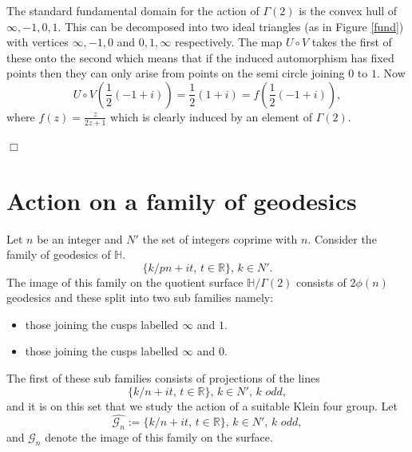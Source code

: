 \documentclass[12pt,a4paper]{amsart}
\def\HH{\mathbb{H}}
\def\xx{\HH/g2}
\def\RR{\mathbb{R}}
\def\g2{\Gamma(2)}
\def\xx{\HH/\g2}
\def\gg{\mathcal{G}_n}
\begin{document}
\proof The standard  fundamental domain for the action of $\g2$ 
is the convex hull of $\infty, -1, 0 , 1$.
This can be decomposed into two ideal triangles (as in Figure \ref{fund})
with vertices $\infty, -1, 0 $ and $ 0 , 1,\infty$ respectively.
The map  $U\circ V$ takes the first of these onto the second
which means that
if the induced automorphism has fixed points then 
they can only arise from points on the semi circle joining $0$ to $1$.
Now
$$U\circ V \left(\frac{1}{2 }(-1+ i) \right)  = \frac{1}{2 }(1+ i) = f \left(\frac{1}{2 }(-1+ i) \right),$$
where $f(z) = \frac{z}{2z + 1}$ which  is clearly induced by an element of $\g2$.

\hfill $\Box$

%


\section{Action on a family of geodesics}

Let $n$ be an integer and 
$N'$  the set of integers coprime with $n$.
Consider the family of geodesics of $\HH$.
$$\{  k/pn+ i t,\, t \in \RR \},\, k \in N'.$$
The image of this family on the quotient surface $\xx$ consists
of $2\phi(n)$ geodesics 
and these split into two sub families namely:
\begin{itemize}
\item those joining the cusps labelled $\infty$ and $1$.
\item those joining the cusps labelled $\infty$ and $0$.
\end{itemize}
The first of these sub families consists of projections of the lines
$$ \{  k/n+ i t,\, t \in \RR \},\, k \in N',\, \textit{k odd},$$
and it is on this set that we study the action of a suitable Klein four group.
Let 
$$\hat{\gg} :=  \{  k/n+ i t,\, t \in \RR \},\, k \in N',\, \textit{k odd},$$
and  $\gg$  denote the image of this family on the surface.
\end{document}
